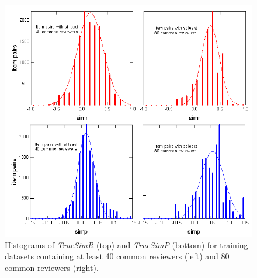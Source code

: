 \documentclass[11pt]{article}
\begin{document}
\begin{figure}[!htbp]
    \centering
    \includegraphics[width=1.0\textwidth]{Histograms.png}
	\caption{Histograms of {\em TrueSimR} (top) and {\em TrueSimP} (bottom) for
training datasets containing at least 40 common reviewers (left) and 80 common
reviewers (right).}
    \label{fig:Histograms}
\end{figure}
\end{document}
